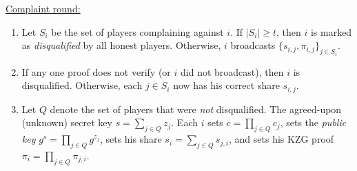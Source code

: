 {\begin{algorithm}[t]

        \underline{Complaint round:}
        \begin{enumerate}
            \item Let $S_i$ be the set of players complaining against $i$. If $|S_i| \ge t$, then $i$ is marked as \textit{disqualified} by all honest players.
                  Otherwise, $i$ broadcasts $\{s_{i,j},\pi_{i,j}\}_{j\in S_i}$.
            \item If any one proof does not verify (or $i$ did not broadcast), then $i$ is disqualified. 
                  Otherwise, each $j\in S_i$ now has his correct share $s_{i,j}$.
            \item Let $Q$ denote the set of players that were \textit{not} disqualified.
                  The agreed-upon (unknown) secret key $s=\sum_{j \in Q} z_j$.
                  Each $i$ 
                sets $c = \prod_{j\in Q} c_j$,
                sets the \textit{public key} $g^s = \prod_{j\in Q} g^{z_j}$,
                sets his share $s_i = \sum_{j\in Q} s_{j,i}$,
                and sets his KZG proof $\pi_i = \prod_{j\in Q} \pi_{j,i}$.
        \end{enumerate}
        

\end{algorithm}}
